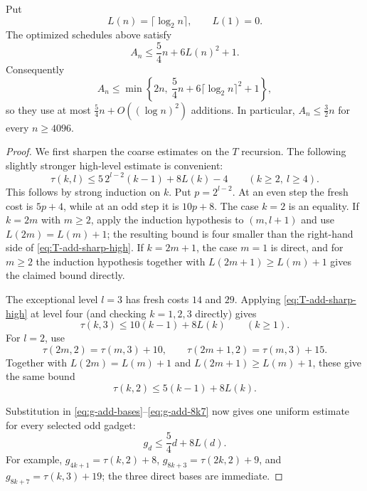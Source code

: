 \begin{theorem}
\label{thm:construction-addition-asymptotic}
Put
\[
  L(n)=\lceil\log_2 n\rceil,
  \qquad L(1)=0.
\]
The optimized schedules above satisfy
\[
  A_n\le \frac54n+6L(n)^2+1.
\]
Consequently
\[
  A_n\le
  \min\left\{2n,\ \frac54n+6\lceil\log_2n\rceil^2+1\right\},
\]
so they use at most $\frac54n+O((\log n)^2)$ additions.  In particular,
$A_n\le\frac32n$ for every $n\ge4096$.
\end{theorem}
\begin{proof}
We first sharpen the coarse estimates on the $T$ recursion.  The following
slightly stronger high-level estimate is convenient:
\begin{equation}
 \tau(k,l)\le
 5\,2^{l-2}(k-1)+8L(k)-4
 \qquad(k\ge2,\ l\ge4).
 \label{eq:T-add-sharp-high}
\end{equation}
This follows by strong induction on $k$.  Put $p=2^{l-2}$.  At an even
step the fresh cost is $5p+4$, while at an odd step it is $10p+8$.
The case $k=2$ is an equality.  If $k=2m$ with $m\ge2$, apply the
induction hypothesis to $(m,l+1)$ and use
$L(2m)=L(m)+1$; the resulting bound is four smaller than the right-hand
side of \eqref{eq:T-add-sharp-high}.  If $k=2m+1$, the case $m=1$ is
direct, and for $m\ge2$ the induction hypothesis together with
$L(2m+1)\ge L(m)+1$ gives the claimed bound directly.

The exceptional level $l=3$ has fresh costs $14$ and $29$.  Applying
\eqref{eq:T-add-sharp-high} at level four (and checking $k=1,2,3$
directly) gives
\begin{equation}
 \tau(k,3)\le10(k-1)+8L(k)
 \qquad(k\ge1).
 \label{eq:T-add-sharp-three}
\end{equation}
For $l=2$, use
\[
 \tau(2m,2)=\tau(m,3)+10,
 \qquad
 \tau(2m+1,2)=\tau(m,3)+15.
\]
Together with $L(2m)=L(m)+1$ and
$L(2m+1)\ge L(m)+1$, these give the same bound
\begin{equation}
 \tau(k,2)\le5(k-1)+8L(k).
 \label{eq:T-add-sharp-two}
\end{equation}

Substitution in \eqref{eq:g-add-bases}--\eqref{eq:g-add-8k7} now gives one
uniform estimate for every selected odd gadget:
\[
  g_d\le\frac54d+8L(d).
  \tag{gadget-sharp-bound}
\]
For example,
$g_{4k+1}=\tau(k,2)+8$,
$g_{8k+3}=\tau(2k,2)+9$, and
$g_{8k+7}=\tau(k,3)+19$; the three direct bases are immediate.


\end{proof}
